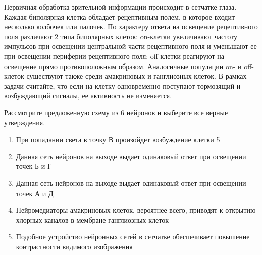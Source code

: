 
Первичная обработка зрительной информации происходит в
сетчатке глаза. Каждая биполярная клетка обладает рецептивным полем, в которое
входит несколько колбочек или палочек. По характеру ответа на освещение
рецептивного поля различают 2 типа биполярных клеток: on-клетки увеличивают частоту импульсов при освещении центральной
части рецептивного поля и уменьшают ее при освещении периферии рецептивного
поля; off-клетки реагируют на
освещение прямо противоположным образом. Аналогичные популяции on- и off-клеток
существуют также среди амакриновых и ганглиозных клеток. В рамках задачи
считайте, что если на клетку одновременно поступают тормозящий и возбуждающий
сигналы, ее активность не изменяется.


Рассмотрите предложенную схему из 6 нейронов и
выберите все верные утверждения.

\begin{enumerate}
    \item При попадании света в точку В произойдет возбуждение клетки 5
    \item Данная сеть нейронов на выходе выдает одинаковый ответ при освещении точек Б и Г
    \item Данная сеть нейронов на выходе выдает одинаковый ответ при освещении точек А и Д
    \item Нейромедиаторы амакриновых клеток, вероятнее всего, приводят к открытию хлорных каналов в мембране ганглиозных клеток
    \item Подобное устройство нейронных сетей в сетчатке обеспечивает повышение контрастности видимого изображения
\end{enumerate}



